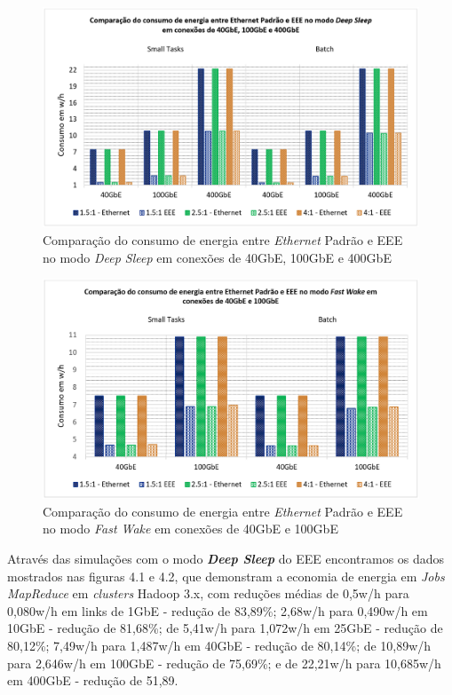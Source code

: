 \begin{figure}[htp]
    \centering
    \includegraphics[width=16cm]{4-EEEHadoop/Image2_EEEConsumption40-100-400.PNG}
    \caption{\centering Comparação do consumo de energia entre \emph{Ethernet} Padrão e EEE no modo \emph{Deep Sleep} em conexões de 40GbE, 100GbE e 400GbE}
    \label{fig:EEEConsumption40-100-400}
\end{figure}

\begin{figure}[htp]
    \centering
    \includegraphics[width=16cm]{4-EEEHadoop/Image5_EEEConsumption40-100-FastWakeMode.PNG}
    \caption{\centering Comparação do consumo de energia entre \emph{Ethernet} Padrão e EEE no modo \emph{Fast Wake} em conexões de 40GbE e 100GbE}
    \label{fig:EEEConsumption100-400FastWakeMode}
\end{figure}

Através das simulações com o modo \textbf{\emph{Deep Sleep}} do EEE encontramos os dados mostrados nas figuras 4.1 e 4.2, que demonstram a economia de energia em \emph{Jobs MapReduce} em \emph{clusters}{} Hadoop 3.x, com reduções médias de 0,5w/h para 0,080w/h em links de 1GbE - redução de 83,89\%; 2,68w/h para 0,490w/h em 10GbE - redução de 81,68\%; de 5,41w/h para 1,072w/h em 25GbE - redução de 80,12\%; 7,49w/h para 1,487w/h em 40GbE - redução de 80,14\%; de 10,89w/h para 2,646w/h em 100GbE - redução de 75,69\%; e de 22,21w/h para 10,685w/h em 400GbE - redução de 51,89.

